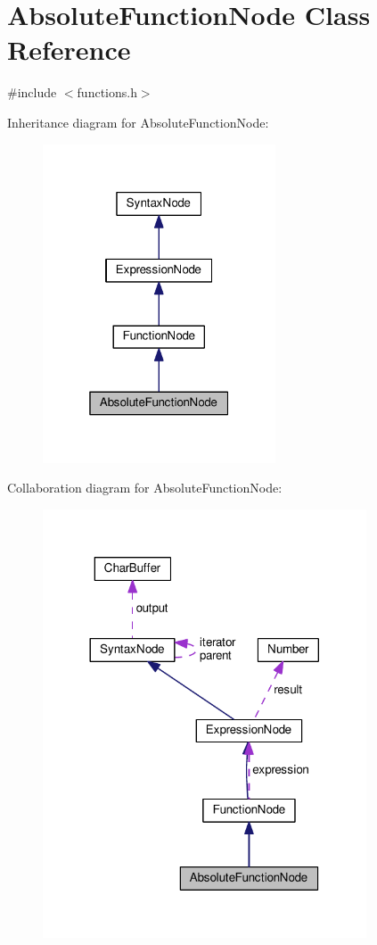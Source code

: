 \hypertarget{classAbsoluteFunctionNode}{}\section{Absolute\+Function\+Node Class Reference}
\label{classAbsoluteFunctionNode}


{\ttfamily \#include $<$functions.\+h$>$}



Inheritance diagram for Absolute\+Function\+Node\+:\nopagebreak
\begin{figure}[H]
\begin{center}
\leavevmode
\includegraphics[width=196pt]{classAbsoluteFunctionNode__inherit__graph}
\end{center}
\end{figure}


Collaboration diagram for Absolute\+Function\+Node\+:\nopagebreak
\begin{figure}[H]
\begin{center}
\leavevmode
\includegraphics[width=272pt]{classAbsoluteFunctionNode__coll__graph}
\end{center}
\end{figure}
